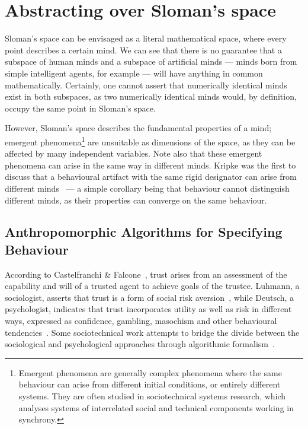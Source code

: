 \section{Abstracting over Sloman's space}

Sloman's space can be envisaged as a literal mathematical space, where every point describes a certain mind. We can see that there is no guarantee that a subspace of human minds and a subspace of artificial minds --- minds born from simple intelligent agents, for example --- will have anything in common mathematically. Certainly, one cannot assert that numerically identical minds exist in both subspaces, as two numerically identical minds would, by definition, occupy the same point in Sloman's space.\par

However, Sloman's space describes the fundamental properties of a mind; emergent phenomena\footnote{Emergent phenomena are generally complex phenomena where the same behaviour can arise from different initial conditions, or entirely different systems. They are often studied in sociotechnical systems research, which analyses systems of interrelated social and technical components working in synchrony.} are unsuitable as dimensions of the space, as they can be affected by many independent variables. Note also that these emergent phenomena can arise in the same way in different minds. Kripke was the first to discuss that a behavioural artifact with the same rigid designator can arise from different minds~\citep{kripke1972naming} --- a simple corollary being that behaviour cannot distinguish different minds, as their properties can converge on the same behaviour.\par

\subsection{Anthropomorphic Algorithms for Specifying Behaviour}

According to Castelfranchi \& Falcone~\citep{CastelfranchiSocialApproach}, trust arises from an assessment of the capability and will of a trusted agent to achieve goals of the trustee. Luhmann, a sociologist, asserts that trust is a form of social risk aversion~\citep{luhmann2000familiarity}, while Deutsch, a psychologist, indicates that trust incorporates utility as well as risk in different ways, expressed as confidence, gambling, masochism and other behavioural tendencies~\citep{deutsch1962cooperation}. Some sociotechnical work attempts to bridge the divide between the sociological and psychological approaches through algorithmic formalism~\citep{Marsh1994FormalisingConcept}.\par

